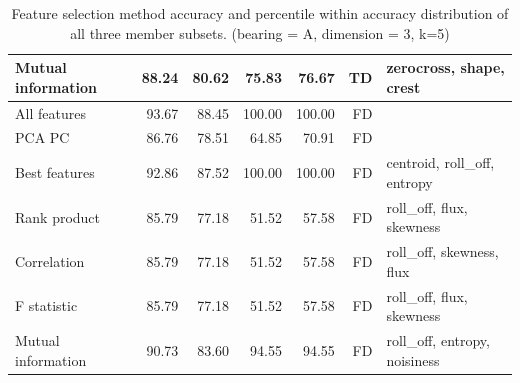 \begin{table}[h]
\begin{adjustbox}{width=\textwidth}
\begin{tabular}{|l|rr|rr|r|l|}
Mutual information                    & \multicolumn{1}{r|}{88.24}          & 80.62                              & \multicolumn{1}{r|}{75.83}          & 76.67                              & TD                                                   & zerocross, shape, crest                 \\ \hline
All features                          & \multicolumn{1}{r|}{93.67}          & 88.45                              & \multicolumn{1}{r|}{100.00}         & 100.00                             & FD                                                  &                                         \\ \hline
PCA PC                                & \multicolumn{1}{r|}{86.76}          & 78.51                              & \multicolumn{1}{r|}{64.85}          & 70.91                              & FD                                                   &                                         \\ \hline
Best features                         & \multicolumn{1}{r|}{92.86}          & 87.52                              & \multicolumn{1}{r|}{100.00}         & 100.00                             & FD                                                   & centroid, roll\_off, entropy            \\ \hline
Rank product                          & \multicolumn{1}{r|}{85.79}          & 77.18                              & \multicolumn{1}{r|}{51.52}          & 57.58                              & FD                                                   & roll\_off, flux, skewness               \\ \hline
Correlation                           & \multicolumn{1}{r|}{85.79}          & 77.18                              & \multicolumn{1}{r|}{51.52}          & 57.58                              & FD                                                   & roll\_off, skewness, flux               \\ \hline
F statistic                           & \multicolumn{1}{r|}{85.79}          & 77.18                              & \multicolumn{1}{r|}{51.52}          & 57.58                              & FD                                                   & roll\_off, flux, skewness               \\ \hline
Mutual information                    & \multicolumn{1}{r|}{90.73}          & 83.60                              & \multicolumn{1}{r|}{94.55}          & 94.55                              & FD                                                   & roll\_off, entropy, noisiness           \\ \hline
\end{tabular}
\end{adjustbox}
\caption{Feature selection method accuracy and percentile within accuracy distribution of all three member subsets. (bearing = A, dimension = 3, k=5)}
\label{tab:evaluation:fsel}
\end{table}

